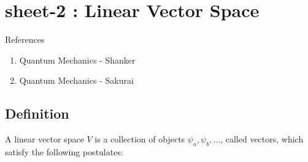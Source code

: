 \chapter{sheet-2 : Linear Vector Space}
References
\begin{enumerate}
	\item 
	Quantum Mechanics	-	Shanker
	
	\item
	Quantum Mechanics	- Sakurai
\end{enumerate}

\section{Definition}
A linear vector space $V$ is a collection of objects $\psi_a, \psi_b, \ldots$, called vectors, which satisfy the following postulates:
